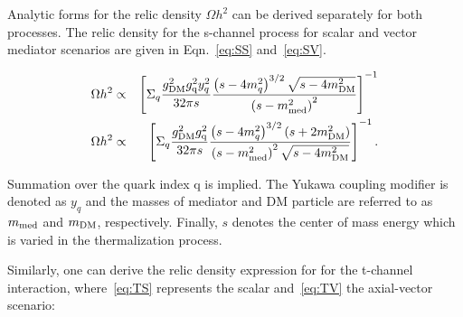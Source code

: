Analytic forms for the relic density $\Omega h^{2}$ can be derived separately for both processes. 
The relic density for the s-channel process for scalar and vector mediator scenarios are given in Eqn.~\ref{eq:SS} and~\ref{eq:SV}.


\begin{eqnarray}
\label{eq:SS} \Omega h^{2} & \propto & \left[\Sigma_{q} \frac{g_{\rm DM}^2 g_{\rm q}^2 y_{q}^2}{32\pi s } \frac{\left(s-4m^2_{q}\right)^{3/2}\sqrt{s-4m_{\rm DM}^2}}{\left(s-m_{\rm med}^2\right)^2} \right]^{-1} \\
\label{eq:SV} \Omega h^{2} & \propto & \left[\Sigma_{q} \frac{g_{\rm DM}^2 g_{\rm q}^2           }{32\pi s } \frac{\left(s-4m^2_{q}\right)^{3/2}        (s+2m_{\rm DM}^2)}{\left(s-m_{\rm med}^2\right)^2\sqrt{s-4m_{\rm DM}^2}} \right]^{-1}. 
\end{eqnarray}

Summation over the quark index q is implied. The Yukawa coupling modifier is denoted as $y_{q}$ and the masses of mediator and DM particle are referred to as $m_{\rm med}$ and $m_{\rm DM}$, respectively. Finally, $s$ denotes the center of mass energy which is varied in the thermalization process. 

Similarly, one can derive the relic density expression for
for the t-channel interaction, where~\ref{eq:TS} represents the scalar and~\ref{eq:TV} the axial-vector scenario:


